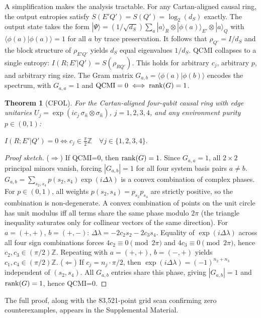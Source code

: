 \documentclass[twocolumn,aps,prl,floatfix]{revtex4-2}
\newtheorem{theorem}{Theorem}
\begin{document}
A simplification makes the analysis tractable. For any Cartan-aligned causal ring, the output entropies satisfy $S(E'Q')=S(Q')=\log_2(d_S)$ exactly. The output state takes the form $|\Psi\rangle=(1/\sqrt{d_S})\sum_a |a\rangle_R\otimes|\phi(a)\rangle_{E'}\otimes|a\rangle_Q$ with $\langle\phi(a)|\phi(a)\rangle=1$ for all $a$ by trace preservation. It follows that $\rho_{Q'}=I/d_S$ and the block structure of $\rho_{E'Q'}$ yields $d_S$ equal eigenvalues $1/d_S$. QCMI collapses to a single entropy: $I(R;E'|Q')=S(\rho_{RQ'})$. This holds for arbitrary $c_j$, arbitrary $p$, and arbitrary ring size. The Gram matrix $G_{a,b}=\langle\phi(a)|\phi(b)\rangle$ encodes the spectrum, with $G_{a,a}=1$ and ${\rm QCMI}=0\iff{\rm rank}(G)=1$.

\begin{theorem}[CFOL]
For the Cartan-aligned four-qubit causal ring with edge unitaries $U_j=\exp(i c_j\,\sigma_{\hat{n}}\otimes\sigma_{\hat{n}})$, $j=1,2,3,4$, and any environment purity $p\in(0,1)$:

$I(R;E'|Q') = 0 \iff c_j \in \frac{\pi}{2}\mathbb{Z} \quad \forall j \in \{1,2,3,4\}.$
\end{theorem}

\begin{proof}[Proof sketch]
($\Rightarrow$) If QCMI=0, then ${\rm rank}(G)=1$. Since $G_{a,a}=1$, all $2\times 2$ principal minors vanish, forcing $|G_{a,b}|=1$ for all four system basis pairs $a\neq b$. $G_{a,b}=\sum_{s_2,s_4} p(s_2,s_4)\exp(i\Delta\lambda)$ is a convex combination of complex phases. For $p\in(0,1)$, all weights $p(s_2,s_4)=p_{s_2}p_{s_4}$ are strictly positive, so the combination is non-degenerate. A convex combination of points on the unit circle has unit modulus iff all terms share the same phase modulo $2\pi$ (the triangle inequality saturates only for collinear vectors of the same direction). For $a=(+,+)$, $b=(+,-)$: $\Delta\lambda=-2c_2 s_2-2c_3 s_4$. Equality of $\exp(i\Delta\lambda)$ across all four sign combinations forces $4c_2\equiv0\pmod{2\pi}$ and $4c_3\equiv0\pmod{2\pi}$, hence $c_2,c_3\in(\pi/2)\mathbb{Z}$. Repeating with $a=(+,+)$, $b=(-,+)$ yields $c_1,c_4\in(\pi/2)\mathbb{Z}$. ($\Leftarrow$) If $c_j=n_j\!\cdot\!\pi/2$, then $\exp(i\Delta\lambda)=(-1)^{n_2+n_3}$ independent of $(s_2,s_4)$. All $G_{a,b}$ entries share this phase, giving $|G_{a,b}|=1$ and ${\rm rank}(G)=1$, hence QCMI=0.
\end{proof}

The full proof, along with the 83,521-point grid scan confirming zero counterexamples, appears in the Supplemental Material.
\end{document}

